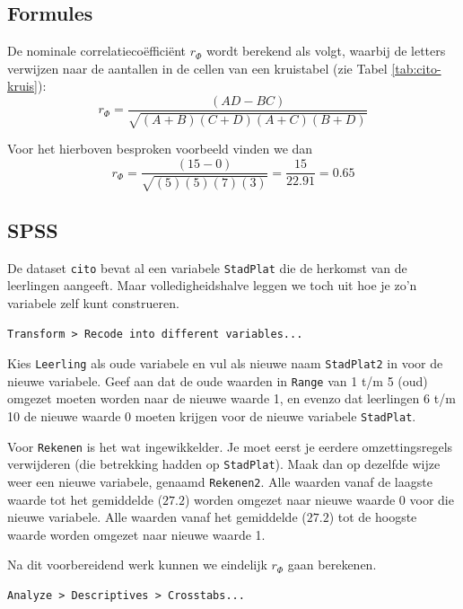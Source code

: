 \documentclass[
]{book}
\begin{document}
\hypertarget{formules-5}{%
\subsection{Formules}\label{formules-5}}

De nominale correlatiecoëfficiënt \(r_\Phi\) wordt berekend als volgt,
waarbij de letters verwijzen naar de aantallen in de cellen van een
kruistabel (zie Tabel \ref{tab:cito-kruis}):
\begin{equation}
    r_\Phi = \frac{(AD-BC)}{\sqrt{(A+B)(C+D)(A+C)(B+D)}}
  \label{eq:phi}
\end{equation}

Voor het hierboven besproken voorbeeld vinden we dan
\[
    r_\Phi = \frac{(15-0)}{\sqrt{(5)(5)(7)(3)}} = \frac{15}{22.91} = 0.65
\]

\hypertarget{spss-8}{%
\subsection{SPSS}\label{spss-8}}

De dataset \texttt{cito} bevat al een variabele \texttt{StadPlat} die de herkomst van de leerlingen aangeeft. Maar volledigheidshalve leggen we toch uit hoe je zo'n variabele zelf kunt construeren.

\begin{verbatim}
Transform > Recode into different variables...
\end{verbatim}

Kies \texttt{Leerling} als oude variabele en vul als nieuwe naam \texttt{StadPlat2}
in voor de nieuwe variabele. Geef aan dat de oude waarden in \texttt{Range} van
1 t/m 5 (oud) omgezet moeten worden naar de nieuwe waarde 1, en evenzo
dat leerlingen 6 t/m 10 de nieuwe waarde 0 moeten krijgen voor de nieuwe
variabele \texttt{StadPlat}.

Voor \texttt{Rekenen} is het wat ingewikkelder. Je moet eerst je eerdere
omzettingsregels verwijderen (die betrekking hadden op \texttt{StadPlat}). Maak
dan op dezelfde wijze weer een nieuwe variabele, genaamd \texttt{Rekenen2}.
Alle waarden vanaf de laagste waarde tot het gemiddelde (\(27.2\)) worden
omgezet naar nieuwe waarde 0 voor die nieuwe variabele. Alle waarden
vanaf het gemiddelde (\(27.2\)) tot de hoogste waarde worden omgezet naar
nieuwe waarde 1.

Na dit voorbereidend werk kunnen we eindelijk \(r_\Phi\) gaan berekenen.

\begin{verbatim}
Analyze > Descriptives > Crosstabs...
\end{verbatim}
\end{document}

